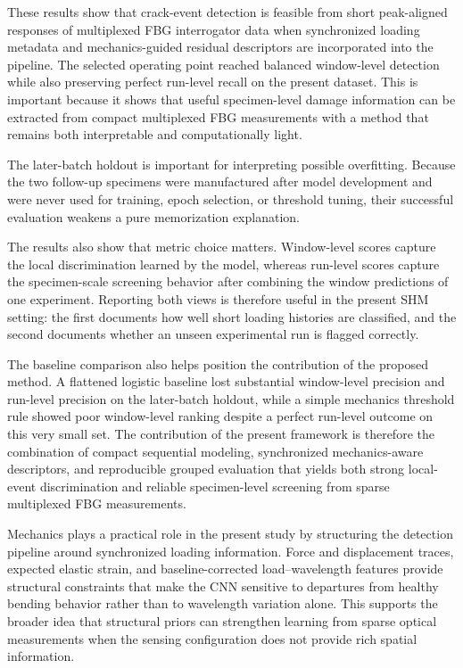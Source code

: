 \documentclass[notspecified,article,submit,pdftex,moreauthors]{Definitions/mdpi}
\newcommand{\rev}[1]{{\color{red}#1}}
\begin{document}
These results show that crack-event detection is feasible from short peak-aligned responses of multiplexed FBG interrogator data when synchronized loading metadata and mechanics-guided residual descriptors are incorporated into the pipeline. The selected operating point reached balanced window-level detection while also preserving perfect run-level recall on the present dataset. This is important because it shows that useful specimen-level damage information can be extracted from compact multiplexed FBG measurements with a method that remains both interpretable and computationally light.

\rev{The later-batch holdout is important for interpreting possible overfitting. Because the two follow-up specimens were manufactured after model development and were never used for training, epoch selection, or threshold tuning, their successful evaluation weakens a pure memorization explanation.}

The results also show that metric choice matters. Window-level scores capture the local discrimination learned by the model, whereas run-level scores capture the specimen-scale screening behavior after combining the window predictions of one experiment. Reporting both views is therefore useful in the present SHM setting: the first documents how well short loading histories are classified, and the second documents whether an unseen experimental run is flagged correctly.

\rev{The baseline comparison also helps position the contribution of the proposed method. A flattened logistic baseline lost substantial window-level precision and run-level precision on the later-batch holdout, while a simple mechanics threshold rule showed poor window-level ranking despite a perfect run-level outcome on this very small set. The contribution of the present framework is therefore the combination of compact sequential modeling, synchronized mechanics-aware descriptors, and reproducible grouped evaluation that yields both strong local-event discrimination and reliable specimen-level screening from sparse multiplexed FBG measurements.}

Mechanics plays a practical role in the present study by structuring the detection pipeline around synchronized loading information. Force and displacement traces, expected elastic strain, and baseline-corrected load--wavelength features provide structural constraints that make the CNN sensitive to departures from healthy bending behavior rather than to wavelength variation alone. This supports the broader idea that structural priors can strengthen learning from sparse optical measurements when the sensing configuration does not provide rich spatial information.
\end{document}
